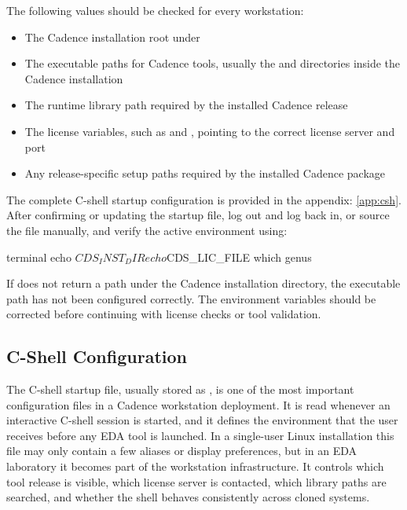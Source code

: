 \noindent The following values should be checked for every workstation:

\begin{itemize}
	\item The Cadence installation root under 
	\item The executable paths for Cadence tools, usually the  and 
	      directories inside the Cadence installation
	\item The runtime library path required by the installed Cadence release
	\item The license variables, such as  and ,
	      pointing to the correct license server and port
	\item Any release-specific setup paths required by the installed Cadence package
\end{itemize}

\noindent The complete C-shell startup configuration is provided in the appendix:
\ref{app:csh}. After confirming or updating the startup file, log
out and log back in, or source the file manually, and verify the active environment using:

\begin{codeblock}{terminal}
echo $CDS_INST_DIR
echo $CDS_LIC_FILE
which genus
\end{codeblock}

If  does not return a path under the Cadence installation directory, the
executable path has not been configured correctly. The environment variables should be corrected
before continuing with license checks or tool validation.\\

\subsection{C-Shell Configuration}

The C-shell startup file, usually stored as , is one of the most important
configuration files in a Cadence workstation deployment. It is read whenever an interactive C-shell
session is started, and it defines the environment that the user receives before any EDA tool is
launched. In a single-user Linux installation this file may only contain a few aliases or display
preferences, but in an EDA laboratory it becomes part of the workstation infrastructure. It controls
which tool release is visible, which license server is contacted, which library paths are searched,
and whether the shell behaves consistently across cloned systems.\\

